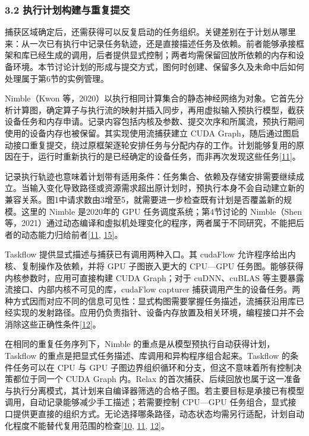 \documentclass[UTF8,11pt,fontset=windows]{ctexart}
\begin{document}
\hypertarget{section-3-2}{%
\subsubsection{3.2 执行计划构建与重复提交}\label{section-3-2}}

捕获区域确定后，还需获得可以反复启动的任务组织。关键差别在于计划从哪里来：从一次已有执行中记录任务轨迹，还是直接描述任务及依赖。前者能够承接框架和库已经生成的调用，后者提供显式控制；两者均需保留回放所依赖的内存和设备环境。本节讨论计划的形成与提交方式，图何时创建、保留多久及未命中后如何处理属于第6节的实例管理。

Nimble（Kwon 等，2020）以执行相同计算集合的静态神经网络为对象。它首先分析计算图，确定算子与执行流的映射并插入同步，再用虚拟输入预执行模型，截获设备任务和内存申请。记录内容包括内核及参数、提交次序和所属流，预执行期间使用的设备内存也被保留。其实现使用流捕获建立 CUDA Graph，随后通过图启动接口重复提交，绕过原框架逐轮安排任务与分配内存的工作。计划能够复用的原因在于，运行时重新执行的是已经确定的设备任务，而非再次发现这些任务\protect\hyperlink{ref-11}{{[}11{]}}。

记录执行轨迹也意味着计划带有适用条件：任务集合、依赖及存储安排需要继续成立。当输入变化导致路径或资源需求超出原计划时，预执行本身不会自动建立新的兼容关系。图1中请求数由3增至5，就需要进一步检查既有计划是否覆盖新的规模。这里的 Nimble 是2020年的 GPU 任务调度系统；第4节讨论的 Nimble（Shen 等，2021）通过动态编译和虚拟机处理变化的程序，两者属于不同研究，不能把后者的动态能力归给前者\protect\hyperlink{ref-11}{{[}11}, \protect\hyperlink{ref-15}{15{]}}。

Taskflow 提供显式描述与捕获已有调用两种入口。其 cudaFlow 允许程序给出内核、复制操作及依赖，并将 GPU 子图嵌入更大的 CPU---GPU 任务图。能够获得内核参数时，应用可直接构建 CUDA Graph；对于 cuDNN、cuBLAS 等主要暴露流接口、内部内核不可见的库，cudaFlow capturer 捕获调用产生的设备任务。两种方式因而对应不同的信息可见性：显式构图需要掌握任务描述，流捕获沿用库已经实现的发射路径。应用仍负责指针、设备内存放置及相关环境，编程接口并不会消除这些正确性条件\protect\hyperlink{ref-12}{{[}12{]}}。

在相同的重复任务序列下，Nimble 的重点是从模型预执行自动获得计划，Taskflow 的重点是把显式任务描述、库调用和异构程序组合起来。Taskflow 的条件任务可以在 CPU 与 GPU 子图边界组织循环和分支，但这不意味着所有控制决策都位于同一个 CUDA Graph 内。Relax 的首次捕获、后续回放也属于这一准备与执行分离模式，其计划来自编译器筛选的合格子图。若主要目标是承接已有模型调用，自动记录能够减少手工描述；若需要控制 CPU---GPU 任务组合，显式接口提供更直接的组织方式。无论选择哪条路径，动态状态均需另行适配，计划自动化程度不能替代复用范围的检查\protect\hyperlink{ref-10}{{[}10}, \protect\hyperlink{ref-11}{11}, \protect\hyperlink{ref-12}{12{]}}。
\end{document}
